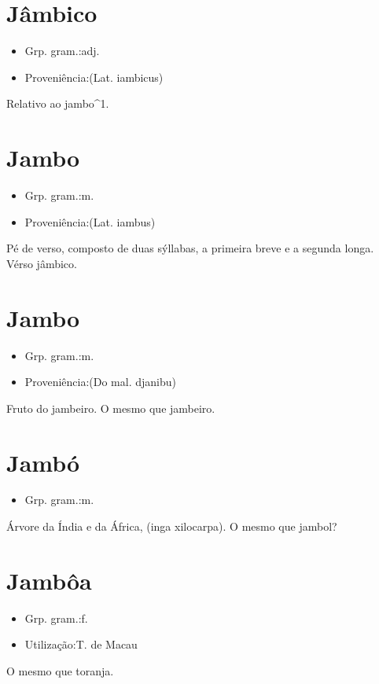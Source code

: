 \documentclass{article}
\begin{document}
\section{Jâmbico}
\begin{itemize}
\item {Grp. gram.:adj.}
\end{itemize}
\begin{itemize}
\item {Proveniência:(Lat. \textunderscore iambicus\textunderscore )}
\end{itemize}
Relativo ao jambo^1.
\section{Jambo}
\begin{itemize}
\item {Grp. gram.:m.}
\end{itemize}
\begin{itemize}
\item {Proveniência:(Lat. \textunderscore iambus\textunderscore )}
\end{itemize}
Pé de verso, composto de duas sýllabas, a primeira breve e a segunda longa.
Vérso jâmbico.
\section{Jambo}
\begin{itemize}
\item {Grp. gram.:m.}
\end{itemize}
\begin{itemize}
\item {Proveniência:(Do mal. \textunderscore djanibu\textunderscore )}
\end{itemize}
Fruto do jambeiro.
O mesmo que \textunderscore jambeiro\textunderscore .
\section{Jambó}
\begin{itemize}
\item {Grp. gram.:m.}
\end{itemize}
Árvore da Índia e da África, (\textunderscore inga xilocarpa\textunderscore ).
O mesmo que \textunderscore jambol\textunderscore ?
\section{Jambôa}
\begin{itemize}
\item {Grp. gram.:f.}
\end{itemize}
\begin{itemize}
\item {Utilização:T. de Macau}
\end{itemize}
O mesmo que \textunderscore toranja\textunderscore .
\end{document}
